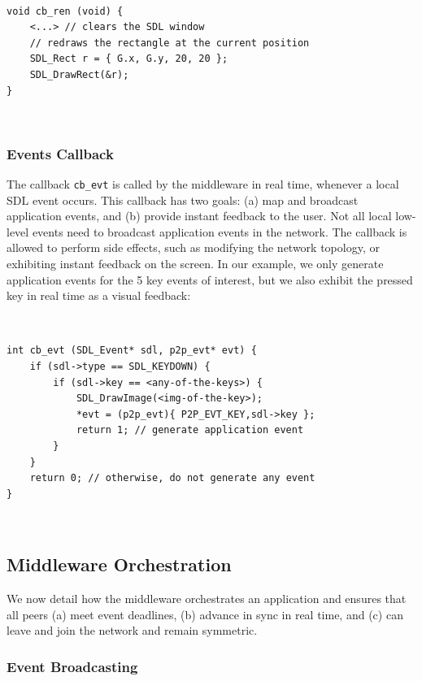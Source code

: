 \documentclass[10pt,journal,compsoc]{IEEEtran}
\newcommand{\code}[1]  {\texttt{\small{#1}}}
\begin{document}
{\footnotesize
~
\begin{verbatim}
void cb_ren (void) {
    <...> // clears the SDL window
    // redraws the rectangle at the current position
    SDL_Rect r = { G.x, G.y, 20, 20 };
    SDL_DrawRect(&r);
}
\end{verbatim}
~
}

\subsubsection{Events Callback}
\label{sec.tml.api.cb_evt}

The callback \code{cb\_evt} is called by the middleware in real time, whenever
a local SDL event occurs.
This callback has two goals:
    (a) map and broadcast application events, and
    (b) provide instant feedback to the user.
Not all local low-level events need to broadcast application events in the
network.
The callback is allowed to perform side effects, such as modifying the network
topology, or exhibiting instant feedback on the screen.
In our example, we only generate application events for the 5 key events of
interest, but we also exhibit the pressed key in real time as a visual
feedback:

{\footnotesize
~
\begin{verbatim}
int cb_evt (SDL_Event* sdl, p2p_evt* evt) {
    if (sdl->type == SDL_KEYDOWN) {
        if (sdl->key == <any-of-the-keys>) {
            SDL_DrawImage(<img-of-the-key>);
            *evt = (p2p_evt){ P2P_EVT_KEY,sdl->key };
            return 1; // generate application event
        }
    }
    return 0; // otherwise, do not generate any event
}
\end{verbatim}
~
}

\subsection{Middleware Orchestration}
\label{sec.tml.middleware}

We now detail how the middleware orchestrates an application and ensures that
all peers
    (a) meet event deadlines,
    (b) advance in sync in real time, and
    (c) can leave and join the network and remain symmetric.

\subsubsection{Event Broadcasting}
\label{sec.tml.middleware.events}
\end{document}

